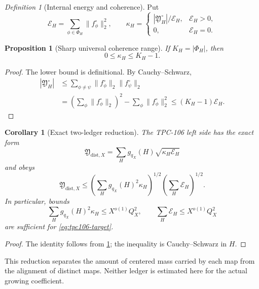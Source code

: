 \documentclass[11pt]{article}
\newtheorem{proposition}[theorem]{Proposition}
\newtheorem{corollary}[theorem]{Corollary}
\theoremstyle{remark}
\newtheorem{definition}[theorem]{Definition}
\newcommand{\Xdist}{\mathfrak Y_{\mathrm{dist},X}}
\newcommand{\YH}{\mathfrak Y_H^\circ}
\begin{document}
\begin{definition}[Internal energy and coherence]
\label{def:coherence}
Put
\[
 \mathcal E_H
 =
 \sum_{\phi\in\Phi_H}\|f_\phi^\circ\|_2^2,
\qquad
 \kappa_H
 =
 \begin{cases}
 |\YH|/\mathcal E_H,
   &\mathcal E_H>0,\\
 0,&\mathcal E_H=0.
 \end{cases}
\]
\end{definition}

\begin{proposition}[Sharp universal coherence range]
\label{prop:coherence-range}
If \(K_H=|\Phi_H|\), then
\begin{equation}
 0\le\kappa_H\le K_H-1.
\label{eq:coherence-range}
\end{equation}
\end{proposition}

\begin{proof}
The lower bound is definitional.  By Cauchy--Schwarz,
\begin{align*}
 |\YH|
 &\le
 \sum_{\phi\ne\psi}
 \|f_\phi^\circ\|_2\|f_\psi^\circ\|_2\\
 &=
 \left(\sum_\phi\|f_\phi^\circ\|_2\right)^2
 -\sum_\phi\|f_\phi^\circ\|_2^2
 \le(K_H-1)\mathcal E_H.
\end{align*}
\end{proof}

\begin{corollary}[Exact two-ledger reduction]
\label{cor:two-ledger}
The TPC-106 left side has the exact form
\begin{equation}
 \Xdist
 =
 \sum_Hg_{q_X}(H)\sqrt{\kappa_H\mathcal E_H}
\label{eq:exact-width-ledger}
\end{equation}
and obeys
\begin{equation}
 \Xdist
 \le
 \left(\sum_Hg_{q_X}(H)^2\kappa_H\right)^{1/2}
 \left(\sum_H\mathcal E_H\right)^{1/2}.
\label{eq:two-ledger-bound}
\end{equation}
In particular, bounds
\[
 \sum_Hg_{q_X}(H)^2\kappa_H
 \le X^{o(1)}Q_X^2,
\qquad
 \sum_H\mathcal E_H
 \le X^{o(1)}Q_X^2
\]
are sufficient for \eqref{eq:tpc106-target}.
\end{corollary}

\begin{proof}
The identity follows from \cref{def:coherence}; the inequality is
Cauchy--Schwarz in \(H\).
\end{proof}

This reduction separates the amount of centered mass carried by
each map from the alignment of distinct maps.  Neither ledger is
estimated here for the actual growing coefficient.
\end{document}
